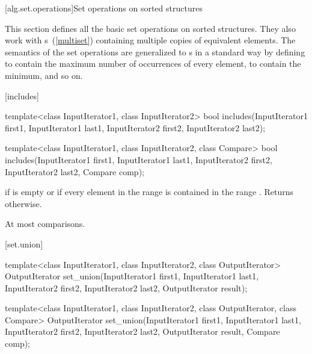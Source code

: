 [alg.set.operations]{Set operations on sorted structures}

\pnum
This section defines all the basic set operations on sorted structures.
They also work with
s~(\ref{multiset})
containing multiple copies of equivalent elements.
The semantics of the set operations are generalized to
s
in a standard way by defining
to contain the maximum number of occurrences of every element,
to contain the minimum, and so on.

[includes]{}

%
\begin{itemdecl}
template<class InputIterator1, class InputIterator2>
  bool includes(InputIterator1 first1, InputIterator1 last1,
                InputIterator2 first2, InputIterator2 last2);

template<class InputIterator1, class InputIterator2, class Compare>
  bool includes(InputIterator1 first1, InputIterator1 last1,
                InputIterator2 first2, InputIterator2 last2,
                Compare comp);
\end{itemdecl}

\begin{itemdescr}
\pnum
\returns
{}
if  is empty or
if every element in the range
is contained in the range
.
Returns
otherwise.

\pnum
\complexity
At most
comparisons.
\end{itemdescr}

[set.union]{}

%
\begin{itemdecl}
template<class InputIterator1, class InputIterator2,
         class OutputIterator>
  OutputIterator
    set_union(InputIterator1 first1, InputIterator1 last1,
              InputIterator2 first2, InputIterator2 last2,
              OutputIterator result);

template<class InputIterator1, class InputIterator2,
         class OutputIterator, class Compare>
  OutputIterator
    set_union(InputIterator1 first1, InputIterator1 last1,
              InputIterator2 first2, InputIterator2 last2,
              OutputIterator result, Compare comp);
\end{itemdecl}

